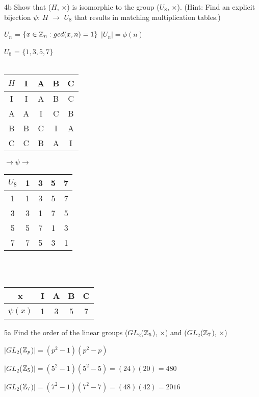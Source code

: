 \begin{question}{4b}
Show that ($H$, $\times$) is isomorphic to the group ($U_8$, $\times$).
(Hint: Find an explicit bijection $\psi$: $H$ $\rightarrow$ $U_8$ that results in matching multiplication
tables.)

$U_n$ = $\{x \in \mathbb{Z}_n : gcd(x, n) = 1\}$ $|U_n| = \phi(n)$

$U_8$ = $\{1,3,5,7\}$
\\\\

\begin{tabular}[c]{c|cccc}
$H$ & I & A & B & C  \\
   \hline
I  & I & A & B & C \\
A  & A & I & C & B \\
B  & B & C & I & A \\
C  & C & B & A & I
\end{tabular}
$ \rightarrow \psi \rightarrow $
\begin{tabular}[c]{c|cccc}
$U_8$& 1 & 3 & 5 & 7  \\
   \hline
1  & 1 & 3 & 5 & 7 \\
3  & 3 & 1 & 7 & 5 \\
5  & 5 & 7 & 1 & 3 \\
7  & 7 & 5 & 3 & 1
\end{tabular}\\\\

\begin{tabular}{c|cccc}
x      & I & A & B & C \\
\hline
$\psi(x)$ & 1 & 3 & 5 & 7
\end{tabular}

\end{question}


\begin{question}{5a}
Find the order of the linear groups ($GL_2$($\mathbb{Z}_5$), $\times$) and ($GL_2$($\mathbb{Z}_7$), $\times$)

$|GL_2$($\mathbb{Z}_p$)$| = (p^2-1)(p^2-p)$

$|GL_2$($\mathbb{Z}_5$)$| = (5^2-1)(5^2-5) = (24)(20) = 480$

$|GL_2$($\mathbb{Z}_7$)$| = (7^2-1)(7^2-7) = (48)(42) = 2016$

\end{question}

